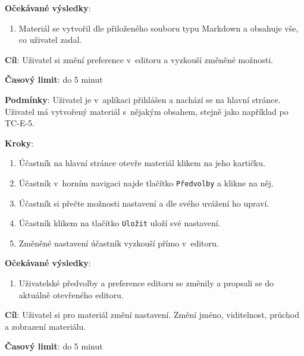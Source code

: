 \textbf{Očekávané výsledky}:

\begin{enumerate}[leftmargin=1.4cm]
    \item Materiál se vytvořil dle přiloženého souboru typu Markdown a obsahuje vše, co uživatel zadal.
\end{enumerate}





\vspace{1em}

\textbf{Cíl}: Uživatel si změní preference v~editoru a vyzkouší změněné možnosti.

\textbf{Časový limit}: do 5 minut

\textbf{Podmínky}:  Uživatel je v~aplikaci přihlášen a nachází se na hlavní stránce.  Uživatel má vytvořený materiál s~nějakým obsahem, stejně jako například po TC-E-5.

\textbf{Kroky}:

\begin{enumerate}[leftmargin=1.4cm]
    \item Účastník na hlavní stránce otevře materiál klikem na jeho kartičku.
    \item Účastník v~horním navigaci najde tlačítko \verb|Předvolby| a klikne na něj.
    \item Účastník si přečte možnosti nastavení a dle svého uvážení ho upraví. 
    \item Účastník klikem na tlačítko \verb|Uložit| uloží své nastavení.
    \item Změněné nastavení účastník vyzkouší přímo v~editoru.
\end{enumerate}

\textbf{Očekávané výsledky}:

\begin{enumerate}[leftmargin=1.4cm]
    \item Uživatelské předvolby a preference editoru se změnily a propsali se do aktuálně otevřeného editoru. 
\end{enumerate}




\vspace{1em}

\textbf{Cíl}: Uživatel si pro materiál změní nastavení. Změní jméno, viditelnost, průchod a zobrazení materiálu.

\textbf{Časový limit}: do 5 minut

